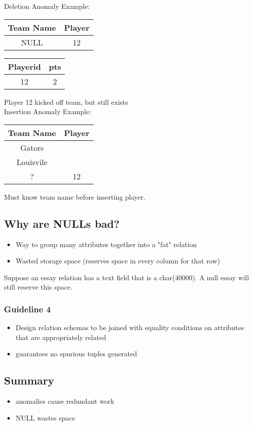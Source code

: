 \documentclass[12pt]{article}
\begin{document}
Deletion Anomaly Example:\\
\begin{tabular}{|c|c|}
\hline
Team Name & Player\\
\hline
NULL & 12\\
\hline
\end{tabular}
\begin{tabular}{|c|c|}
\hline
Playerid & pts\\
\hline
12 & 2\\
\hline
\end{tabular}
Player 12 kicked off team, but still exists\\

Insertion Anomaly Example:\\
\begin{tabular}{|c|c|}
\hline
Team Name & Player\\
\hline
Gators & \\
\hline
Louisvile & \\
\hline
? & 12\\
\hline
\end{tabular}
Must know team name before inserting player.

\subsection{Why are NULLs bad?}
\begin{itemize}
  \item {Way to group many attributes together into a "fat" relation}
  \item {Wasted storage space (reserves space in every column for that row)}
\end{itemize}

Suppose an essay relation has a text field that is a char(40000). A null essay
will still reserve this space.

\subsubsection{Guideline 4}
\begin{itemize}
  \item {Design relation schemas to be joined with equality conditions on
      attributes that are appropriately related}
  \item {guarantees no spurious tuples generated}
\end{itemize}

\subsection{Summary}
\begin{itemize}
  \item {anomalies cause redundant work}
  \item {NULL wastes space}
\end{itemize}
\end{document}
